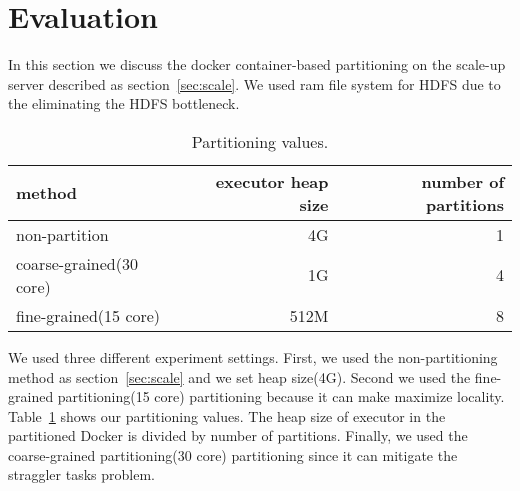 \section{Evaluation}
\label{sec:eval}


In this section we discuss the docker container-based partitioning on the
scale-up server described as section~\ref{sec:scale}.
We used ram file system for HDFS due to the eliminating the HDFS bottleneck.


\begin{table}[h!]
  \centering
  \small
  \begin{tabular}{l r r} \toprule
    method & executor heap size & number of partitions\\
    \midrule
    non-partition & 4G & 1  \\ 
    coarse-grained(30 core) & 1G & 4\\
    fine-grained(15 core) & 512M & 8\\
    \bottomrule
  \end{tabular}
  \caption{Partitioning values.}
  \label{tab:memusepart}
\end{table}


We used three different experiment settings.
First, we used the non-partitioning method as section~\ref{sec:scale} and we set
heap size(4G).
Second we used the fine-grained partitioning(15 core) partitioning
because it can make maximize locality.
Table~\ref{tab:memusepart} shows our partitioning values.
The heap size of executor in the partitioned Docker is divided
by number of partitions.
Finally, we used the coarse-grained partitioning(30 core) partitioning
since it can mitigate the straggler tasks problem.

